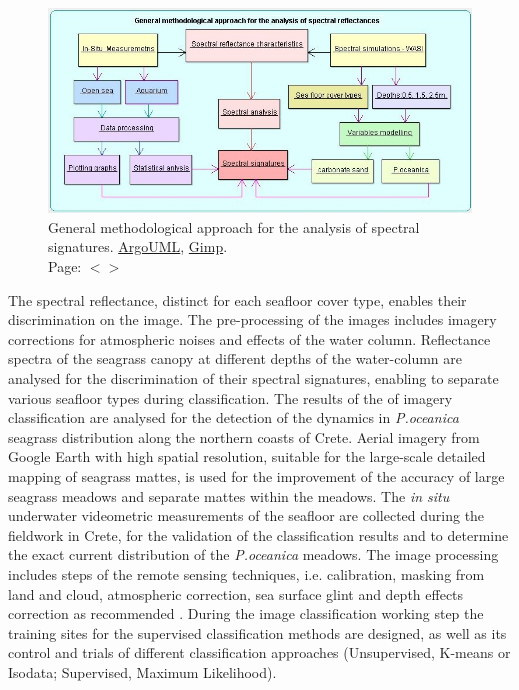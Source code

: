 \documentclass[11pt]{article}
\begin{document}
\begin{figure}[H]
	\centering
	\includegraphics[scale=0.63]{UML_ClassDiagram.jpg}
	\caption{General methodological approach for the analysis of spectral signatures. \href{http://argouml.tigris.org/}{ArgoUML}, \href{http://www.gimp.org/}{Gimp}. \\ Page: $<$\pageref{page-9}$>$}
	\label{fig:1.10}
\end{figure}

The spectral reflectance, distinct for each seafloor cover type, enables their discrimination on the image. The pre-processing
of the images includes imagery corrections for atmospheric noises and effects of the water
column. Reflectance spectra of the seagrass canopy at different depths of the water-column are
analysed for the discrimination of their spectral signatures, enabling to separate various seafloor types
during classification. The results of the of imagery classification are analysed for the detection of the
dynamics in \textit{P.oceanica} seagrass distribution along the northern coasts of Crete. Aerial imagery from
Google Earth with high spatial resolution, suitable for the large-scale detailed mapping of seagrass
mattes, is used for the improvement of the accuracy of large seagrass meadows and separate mattes
within the meadows. The \textit{in situ} underwater videometric measurements of the seafloor are collected
during the fieldwork in Crete, for the validation of the classification results and to determine the exact
current distribution of the \textit{P.oceanica} meadows. The image processing includes steps of the remote
sensing techniques, i.e. calibration, masking from land and cloud, atmospheric correction, sea surface
glint and depth effects correction as recommended \cite{Matarrese08}\label{Matarrese08}. During the image classification
working step the training sites for the supervised classification methods are designed, as well as its
control and trials of different classification approaches (Unsupervised, K-means or Isodata;
Supervised, Maximum Likelihood).
\pagebreak
\end{document}
